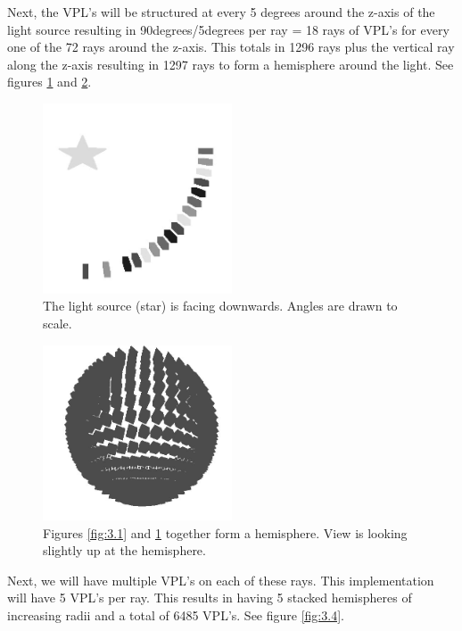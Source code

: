 Next, the VPL's will be structured at every 5 degrees around the z-axis of the light source resulting in 90degrees/5degrees per ray = 18 rays of VPL's for every one of the 72 rays around the z-axis.  This totals in 1296 rays plus the vertical ray along the z-axis resulting in 1297 rays to form a hemisphere around the light. See figures \ref{fig:3.2} and \ref{fig:3.3}.

\begin{figure}[h!]
  \centering
    \includegraphics[width=0.5\textwidth]{Figure32_gray.jpg}
  \caption{The light source (star) is facing downwards. Angles are drawn to scale.}
	\label{fig:3.2}
\end{figure}


\begin{figure}[h!]
  \centering
    \includegraphics[width=0.5\textwidth]{Figure33_gray.jpg}
  \caption{Figures \ref{fig:3.1} and \ref{fig:3.2} together form a hemisphere. View is looking slightly up at the hemisphere.}
	\label{fig:3.3}
\end{figure}

Next, we will have multiple VPL's on each of these rays.  This implementation will have 5 VPL's per ray.  This results in having 5 stacked hemispheres of increasing radii and a total of 6485 VPL's. See figure \ref{fig:3.4}.

